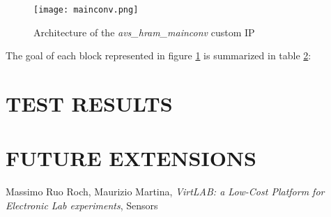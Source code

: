 \documentclass[10pt, english, a4paper, titlepage, oneside]{book}
\begin{document}
\vspace{4mm}
\begin{figure}[H]
    \centering
    \captionsetup{width=18cm}
    \texttt{[image: mainconv.png]}
    \caption{\centering Architecture of the \textit{avs\_hram\_mainconv} custom IP}
    \label{mainconv}
\end{figure}
\vspace{6mm}
The goal of each block represented in figure \ref{mainconv} is summarized in table \ref{}:






\chapter{TEST RESULTS} \label{test result}


\chapter{FUTURE EXTENSIONS}

\begin{thebibliography}{1}
     Massimo Ruo Roch, Maurizio Martina, \emph{VirtLAB: a Low-Cost Platform for Electronic Lab experiments}, Sensors
\end{thebibliography}
\end{document}
